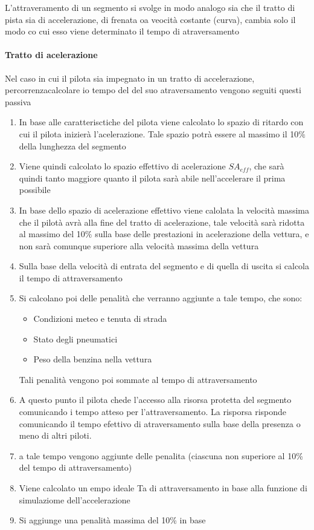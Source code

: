 \documentclass[a4paper,11pt, twoside]{book}
\begin{document}
	  L'attraveramento di un segmento si svolge in modo analogo sia che il tratto di pista sia
	  di accelerazione, di frenata oa veocità costante (curva), cambia solo il modo co cui esso viene 
	  determinato il tempo di atraversamento
	  
	  \paragraph{Tratto di acelerazione\\}
	    Nel caso in cui il pilota sia impegnato in un tratto di accelerazione, percorrenzacalcolare io tempo del
	    del suo atraversamento vengono seguiti questi passiva
	    
	    \begin{enumerate}
	      \item In base alle caratterisctiche del pilota viene calcolato lo spazio di ritardo con cui il
		    pilota inizierà l'acelerazione. Tale spazio potrà essere al massimo il 10$\%$ della lunghezza del segmento
	      \item Viene quindi calcolato lo spazio effettivo di acelerazione $SA_{eff}$, che sarà quindi tanto maggiore quanto
		    il pilota sarà abile nell'accelerare il prima possibile
	      \item In base dello spazio di acelerazione effettivo viene calolata la velocità massima che il pilotà avrà alla fine del 
		    tratto di acelerazione,
		    tale velocità sarà ridotta al massimo del 10$\%$ sulla base delle prestazioni in acelerazione della vettura,
		    e non sarà comunque superiore alla velocità massima della vettura
	      \item Sulla base della velocità di entrata del segmento e di quella di uscita si calcola il tempo di attraversamento
	      \item Si calcolano poi delle penalità che verranno aggiunte a tale tempo, che sono:
		    \begin{itemize}
		      \item Condizioni meteo e tenuta di strada
		      \item Stato degli pneumatici
		      \item Peso della benzina nella vettura
		    \end{itemize}
		    Tali penalità vengono poi sommate al tempo di attraversamento
	      \item A questo punto il pilota chede l'accesso alla risorsa protetta del segmento
		    comunicando i tempo atteso per l'attraversamento. La risporsa risponde comunicando il tempo
		    efettivo di atraversamento sulla base della presenza o meno di altri piloti.
	      
	      \item a tale tempo vengono aggiunte delle penalita (ciascuna non superiore al 10\% del tempo di attraversamento)
	      \item Viene calcolato un empo ideale Ta di attraversamento in base alla funzione di simulaziome dell'accelerazione
	      \item Si aggiunge una penalità massima del 10\% in base  
	    \end{enumerate}
	    
\end{document}
